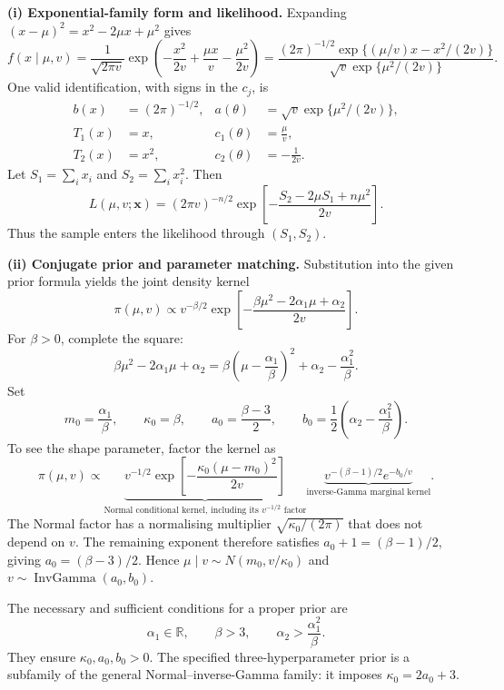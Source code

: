 \documentclass[11pt,a4paper]{article}
\newcommand{\given}{\mathrel{|}}
\newcommand{\xvec}{\boldsymbol{x}}
\DeclareMathOperator{\InvGamma}{InvGamma}
\begin{document}
\textbf{(i) Exponential-family form and likelihood.}
Expanding $(x-\mu)^2=x^2-2\mu x+\mu^2$ gives
\[
f(x\given\mu,v)
=\frac1{\sqrt{2\pi v}}
 \exp\left(-\frac{x^2}{2v}+\frac{\mu x}{v}-\frac{\mu^2}{2v}\right)
=\frac{(2\pi)^{-1/2}\exp\{(\mu/v)x-x^2/(2v)\}}
 {\sqrt v\exp\{\mu^2/(2v)\}}.
\]
One valid identification, with signs in the $c_j$, is
\[
\boxed{\begin{aligned}
b(x)&=(2\pi)^{-1/2},& a(\theta)&=\sqrt v\exp\{\mu^2/(2v)\},\\
T_1(x)&=x,&c_1(\theta)&=\frac\mu v,\\
T_2(x)&=x^2,&c_2(\theta)&=-\frac1{2v}.
\end{aligned}}
\]
Let $S_1=\sum_i x_i$ and $S_2=\sum_i x_i^2$. Then
\[
\boxed{L(\mu,v;\xvec)
=(2\pi v)^{-n/2}
\exp\left[-\frac{S_2-2\mu S_1+n\mu^2}{2v}\right].}
\]
Thus the sample enters the likelihood through $(S_1,S_2)$.

\textbf{(ii) Conjugate prior and parameter matching.}
Substitution into the given prior formula yields the joint density kernel
\[
\pi(\mu,v)
\propto v^{-\beta/2}
\exp\left[-\frac{\beta\mu^2-2\alpha_1\mu+\alpha_2}{2v}\right].
\]
For $\beta>0$, complete the square:
\[
\beta\mu^2-2\alpha_1\mu+\alpha_2
=\beta\left(\mu-\frac{\alpha_1}{\beta}\right)^2
 +\alpha_2-\frac{\alpha_1^2}{\beta}.
\]
Set
\[
\boxed{m_0=\frac{\alpha_1}{\beta},\qquad
\kappa_0=\beta,\qquad a_0=\frac{\beta-3}{2},\qquad
b_0=\frac12\left(\alpha_2-\frac{\alpha_1^2}{\beta}\right).}
\]
To see the shape parameter, factor the kernel as
\[
\pi(\mu,v)\propto
\underbrace{v^{-1/2}
 \exp\left[-\frac{\kappa_0(\mu-m_0)^2}{2v}\right]}
 _{\text{Normal conditional kernel, including its }v^{-1/2}\text{ factor}}
\underbrace{v^{-(\beta-1)/2}e^{-b_0/v}}
 _{\text{inverse-Gamma marginal kernel}}.
\]
The Normal factor has a normalising multiplier
$\sqrt{\kappa_0/(2\pi)}$ that does not depend on $v$.
The remaining exponent therefore satisfies
$a_0+1=(\beta-1)/2$, giving $a_0=(\beta-3)/2$.
Hence $\mu\given v\sim N(m_0,v/\kappa_0)$ and
$v\sim\InvGamma(a_0,b_0)$.

The necessary and sufficient conditions for a proper prior are
\[
\boxed{\alpha_1\in\mathbb R,\qquad\beta>3,\qquad
\alpha_2>\frac{\alpha_1^2}{\beta}.}
\]
They ensure $\kappa_0,a_0,b_0>0$. The specified three-hyperparameter
prior is a subfamily of the general Normal--inverse-Gamma family:
it imposes $\kappa_0=2a_0+3$.
\end{document}
